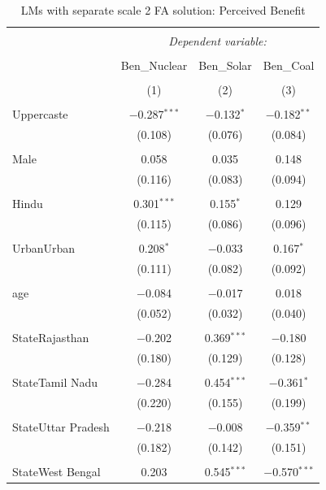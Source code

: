 \documentclass[
]{article}
\begin{document}
\begin{table}[!htbp] \centering 
  \caption{LMs with separate scale 2 FA solution: Perceived Benefit} 
  \label{} 
\begin{tabular}{@{\extracolsep{5pt}}lccc} 
\\[-1.8ex]\hline 
\hline \\[-1.8ex] 
 & \multicolumn{3}{c}{\textit{Dependent variable:}} \\ 
\cline{2-4} 
\\[-1.8ex] & Ben\_Nuclear & Ben\_Solar & Ben\_Coal \\ 
\\[-1.8ex] & (1) & (2) & (3)\\ 
\hline \\[-1.8ex] 
 Uppercaste & $-$0.287$^{***}$ & $-$0.132$^{*}$ & $-$0.182$^{**}$ \\ 
  & (0.108) & (0.076) & (0.084) \\ 
  & & & \\ 
 Male & 0.058 & 0.035 & 0.148 \\ 
  & (0.116) & (0.083) & (0.094) \\ 
  & & & \\ 
 Hindu & 0.301$^{***}$ & 0.155$^{*}$ & 0.129 \\ 
  & (0.115) & (0.086) & (0.096) \\ 
  & & & \\ 
 UrbanUrban & 0.208$^{*}$ & $-$0.033 & 0.167$^{*}$ \\ 
  & (0.111) & (0.082) & (0.092) \\ 
  & & & \\ 
 age & $-$0.084 & $-$0.017 & 0.018 \\ 
  & (0.052) & (0.032) & (0.040) \\ 
  & & & \\ 
 StateRajasthan & $-$0.202 & 0.369$^{***}$ & $-$0.180 \\ 
  & (0.180) & (0.129) & (0.128) \\ 
  & & & \\ 
 StateTamil Nadu & $-$0.284 & 0.454$^{***}$ & $-$0.361$^{*}$ \\ 
  & (0.220) & (0.155) & (0.199) \\ 
  & & & \\ 
 StateUttar Pradesh & $-$0.218 & $-$0.008 & $-$0.359$^{**}$ \\ 
  & (0.182) & (0.142) & (0.151) \\ 
  & & & \\ 
 StateWest Bengal & 0.203 & 0.545$^{***}$ & $-$0.570$^{***}$ \\ 

\end{tabular}
\end{table}
\end{document}
